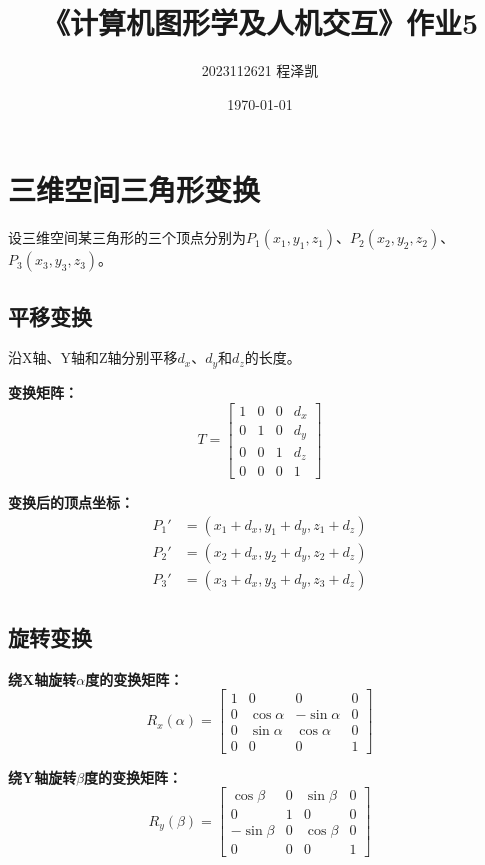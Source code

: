 \documentclass[12pt,a4paper]{article}
\title{《计算机图形学及人机交互》作业5}
\author{2023112621 程泽凯}
\date{\today}
\begin{document}
\maketitle
\thispagestyle{empty}
\newpage

\tableofcontents
\thispagestyle{empty}
\newpage
\setcounter{page}{1}

\section{三维空间三角形变换}

设三维空间某三角形的三个顶点分别为$P_1(x_1,y_1,z_1)$、$P_2(x_2,y_2,z_2)$、$P_3(x_3,y_3,z_3)$。

\subsection{平移变换}

沿X轴、Y轴和Z轴分别平移$d_x$、$d_y$和$d_z$的长度。

\textbf{变换矩阵：}
\[
T = \begin{bmatrix}
1 & 0 & 0 & d_x \\
0 & 1 & 0 & d_y \\
0 & 0 & 1 & d_z \\
0 & 0 & 0 & 1
\end{bmatrix}
\]

\textbf{变换后的顶点坐标：}
\begin{align*}
P_1' &= (x_1 + d_x, y_1 + d_y, z_1 + d_z) \\
P_2' &= (x_2 + d_x, y_2 + d_y, z_2 + d_z) \\
P_3' &= (x_3 + d_x, y_3 + d_y, z_3 + d_z)
\end{align*}

\subsection{旋转变换}

\textbf{绕X轴旋转$\alpha$度的变换矩阵：}
\[
R_x(\alpha) = \begin{bmatrix}
1 & 0 & 0 & 0 \\
0 & \cos\alpha & -\sin\alpha & 0 \\
0 & \sin\alpha & \cos\alpha & 0 \\
0 & 0 & 0 & 1
\end{bmatrix}
\]

\textbf{绕Y轴旋转$\beta$度的变换矩阵：}
\[
R_y(\beta) = \begin{bmatrix}
\cos\beta & 0 & \sin\beta & 0 \\
0 & 1 & 0 & 0 \\
-\sin\beta & 0 & \cos\beta & 0 \\
0 & 0 & 0 & 1
\end{bmatrix}
\]
\end{document}
